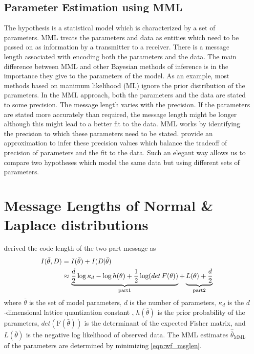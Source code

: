 \documentclass[wcp]{jmlr}
\begin{document}
\subsection{Parameter Estimation using MML}
The hypothesis is a statistical model which is characterized by a set of parameters.
MML treats the parameters and data as entities which need to be passed on as 
information by a transmitter to a receiver. There is a message length associated
with encoding both the parameters and the data. The main difference between MML and
other Bayesian methods of inference is in the importance they give to the
parameters of the model. As an example, most methods based on manimum likelihood (ML)
ignore the prior distribution of the parameters. In the MML approach, both the 
parameters and the data are stated to some precision. The message length varies
with the precision. If the parameters are stated more accurately than required, the 
message length might be longer although this might lead to a better fit to the data. 
MML works by identifying the precision to which these 
parameters need to be stated. \citet{wallace-87} provide an approximation to infer
these precision values which balance the tradeoff of precision of parameters and the 
fit to the data. Such an elegant way allows us to compare two hypotheses which
model the same data but using different sets of parameters.

\section{Message Lengths of Normal \& Laplace distributions}
\citet{wallace-87} derived the code length of the two part message as
\begin{align}
I(\bar{\theta},D) &= I(\bar{\theta}) + I(D|\bar{\theta}) \notag\\
&\approx \underbrace{\frac{d}{2}\log\kappa_d -\log h(\bar{\theta}) + \frac{1}{2}\log(det\,F(\bar{\theta}))}_{\mathrm{part 1}} + \underbrace{L(\bar{\theta}) + \frac{d}{2}}_{\mathrm{part 2}} \label{eqn:wf_msglen}
\end{align}
where $\bar{\theta}$ is the set of model parameters, $d$ is the number of parameters, 
$\kappa_d$ is the $d$-dimensional lattice quantization constant \citep{conwaySloane84}, 
$h(\bar{\theta})$ is the prior probability of the parameters, 
$det(\mathrm{F}(\bar{\theta}))$ is the determinant of the expected Fisher matrix, and
$L(\bar{\theta})$ is the negative log likelihood of observed data. The MML estimates 
$\hat{\bar{\theta}}_{\mathrm{MML}}$ of the parameters are determined by minimizing 
\eqref{eqn:wf_msglen}. 
\end{document}
